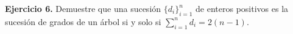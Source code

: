 \textbf{Ejercicio 6.} Demuestre que una sucesión $\{d_i\}_{i = 1}^{n}$ de 
enteros positivos es la sucesión de grados de un árbol si y solo si 
$\sum_{i = 1}^{n}d_i = 2(n - 1)$.